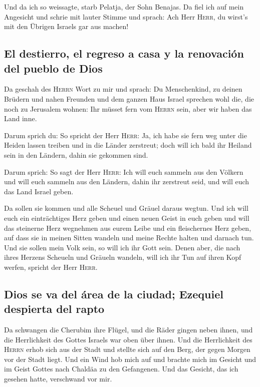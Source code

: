 Und da ich so weissagte, starb Pelatja, der Sohn
Benajas. Da fiel ich auf mein Angesicht und schrie mit lauter Stimme und
sprach: Ach Herr \textsc{Herr}, du wirst's mit den Übrigen Israels gar
aus machen!

\hypertarget{el-destierro-el-regreso-a-casa-y-la-renovaciuxf3n-del-pueblo-de-dios}{%
\subsection{El destierro, el regreso a casa y la renovación del pueblo
de
Dios}\label{el-destierro-el-regreso-a-casa-y-la-renovaciuxf3n-del-pueblo-de-dios}}

 Da geschah des \textsc{Herrn} Wort zu mir und sprach:
 Du Menschenkind, zu deinen Brüdern und nahen Freunden
und dem ganzen Haus Israel sprechen wohl die, die noch zu Jerusalem
wohnen: Ihr müsset fern vom \textsc{Herrn} sein, aber wir haben das Land
inne.

 Darum sprich du: So spricht der Herr \textsc{Herr}: Ja,
ich habe sie fern weg unter die Heiden lassen treiben und in die Länder
zerstreut; doch will ich bald ihr Heiland sein in den Ländern, dahin sie
gekommen sind.

 Darum sprich: So sagt der Herr \textsc{Herr}: Ich will
euch sammeln aus den Völkern und will euch sammeln aus den Ländern,
dahin ihr zerstreut seid, und will euch das Land Israel geben.

 Da sollen sie kommen und alle Scheuel und Gräuel daraus
wegtun.  Und ich will euch ein einträchtiges Herz geben
und einen neuen Geist in euch geben und will das steinerne Herz
wegnehmen aus eurem Leibe und ein fleischernes Herz geben,
 auf dass sie in meinen Sitten wandeln und meine Rechte
halten und darnach tun. Und sie sollen mein Volk sein, so will ich ihr
Gott sein.  Denen aber, die nach ihres Herzens Scheueln
und Gräueln wandeln, will ich ihr Tun auf ihren Kopf werfen, spricht der
Herr \textsc{Herr}.

\hypertarget{dios-se-va-del-uxe1rea-de-la-ciudad-ezequiel-despierta-del-rapto}{%
\subsection{Dios se va del área de la ciudad; Ezequiel despierta del
rapto}\label{dios-se-va-del-uxe1rea-de-la-ciudad-ezequiel-despierta-del-rapto}}

 Da schwangen die Cherubim ihre Flügel, und die Räder
gingen neben ihnen, und die Herrlichkeit des Gottes Israels war oben
über ihnen.  Und die Herrlichkeit des \textsc{Herrn}
erhob sich aus der Stadt und stellte sich auf den Berg, der gegen Morgen
vor der Stadt liegt.  Und ein Wind hob mich auf und
brachte mich im Gesicht und im Geist Gottes nach Chaldäa zu den
Gefangenen. Und das Gesicht, das ich gesehen hatte, verschwand vor mir.

